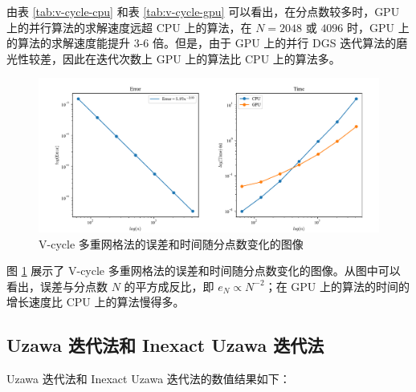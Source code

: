 \documentclass{article}
\begin{document}
由表 \ref{tab:v-cycle-cpu} 和表 \ref{tab:v-cycle-gpu} 可以看出，在分点数较多时，GPU 上的并行算法的求解速度远超 CPU 上的算法，在 $N=2048$ 或 $4096$ 时，GPU 上的算法的求解速度能提升 3-6 倍。但是，由于 GPU 上的并行 DGS 迭代算法的磨光性较差，因此在迭代次数上 GPU 上的算法比 CPU 上的算法多。

\begin{figure}[H]
    \centering
    \includegraphics[width=\textwidth]{fig/vcycle.pdf}
    \caption{V-cycle 多重网格法的误差和时间随分点数变化的图像}
    \label{fig:vcycle}
\end{figure}

图 \ref{fig:vcycle} 展示了 V-cycle 多重网格法的误差和时间随分点数变化的图像。从图中可以看出，误差与分点数 $N$ 的平方成反比，即 $e_N\propto N^{-2}$；在 GPU 上的算法的时间的增长速度比 CPU 上的算法慢得多。

\subsection{Uzawa 迭代法和 Inexact Uzawa 迭代法}

Uzawa 迭代法和 Inexact Uzawa 迭代法的数值结果如下：

\begin{table}[H]
    \centering
    \caption{Uzawa 迭代法的数值结果}
    \label{tab:uzawa}
\end{table}
\end{document}
